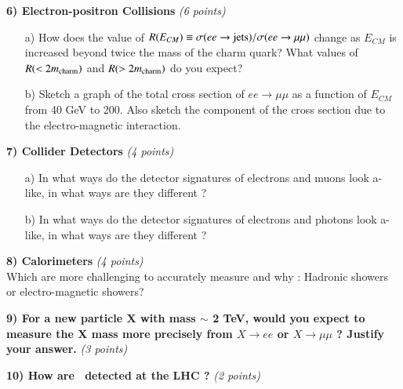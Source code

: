 {\clearpage

\textbf{6) Electron-positron Collisions } \hfill \textit{(6 points)}\\
\begin{itemize}
\item[a)]{
How does the value of $R(E_{CM}) \equiv \sigma(ee\rightarrow \textrm{jets})/\sigma(ee\rightarrow \mu\mu)$ change as $E_{CM}$ is increased beyond twice the mass of the charm quark? 
What values of $R(< 2 m_{\textrm{charm}})$ and $R(> 2 m_{\textrm{charm}})$ do you expect?
}

\item[b)]{Sketch a graph of the total cross section of $ee\rightarrow\mu\mu$ as a function of $E_{CM}$ from 40 GeV to 200. 
Also sketch the component of the cross section due to the electro-magnetic interaction.
}
\end{itemize}

\vspace*{0.5in}

\textbf{7) Collider Detectors  } \hfill \textit{(4 points)}\\
\begin{itemize}
\item[a)]{ In what ways do the detector signatures of electrons and muons look a-like, in what ways are they different ?
}
\item[b)]{ In what ways do the detector signatures of electrons and photons look a-like, in what ways are they different ?
}
\end{itemize}

\vspace*{0.5in}
        

\textbf{8) Calorimeters } \hfill \textit{(4 points)}\\
Which are more challenging to accurately measure and why : Hadronic showers or electro-magnetic showers? 

\vspace*{0.5in}

\textbf{9) For a new particle X with mass $\sim$ 2 TeV,  would you expect to measure the X mass more precisely from $X\rightarrow ee$ or $X \rightarrow \mu\mu$ ? Justify your answer.} \hfill \textit{(3 points)}\\
\vspace*{0.5in}


\textbf{10) How are \nus\ detected at the LHC ?} \hfill \textit{(2 points)}\\
\vspace*{0.5in}

}
